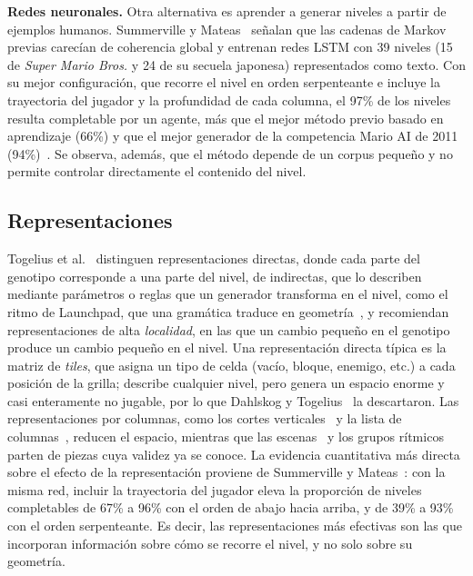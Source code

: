 \documentclass[letter, 10pt]{article}
\begin{document}
\textbf{Redes neuronales.} Otra alternativa es aprender a generar niveles a partir de ejemplos humanos. Summerville y Mateas~\cite{Summerville2016} se\~nalan que las cadenas de Markov previas carec\'ian de coherencia global y entrenan redes LSTM con 39 niveles (15 de \emph{Super Mario Bros.} y 24 de su secuela japonesa) representados como texto. Con su mejor configuraci\'on, que recorre el nivel en orden serpenteante e incluye la trayectoria del jugador y la profundidad de cada columna, el 97\% de los niveles resulta completable por un agente, m\'as que el mejor m\'etodo previo basado en aprendizaje (66\%) y que el mejor generador de la competencia Mario AI de 2011 (94\%)~\cite{Summerville2016}. Se observa, adem\'as, que el m\'etodo depende de un corpus peque\~no y no permite controlar directamente el contenido del nivel.

\subsection{Representaciones}

Togelius et al.~\cite{Togelius2011} distinguen representaciones directas, donde cada parte del genotipo corresponde a una parte del nivel, de indirectas, que lo describen mediante par\'ametros o reglas que un generador transforma en el nivel, como el ritmo de Launchpad, que una gram\'atica traduce en geometr\'ia~\cite{Smith2011}, y recomiendan representaciones de alta \emph{localidad}, en las que un cambio peque\~no en el genotipo produce un cambio peque\~no en el nivel. Una representaci\'on directa t\'ipica es la matriz de \emph{tiles}, que asigna un tipo de celda (vac\'io, bloque, enemigo, etc.) a cada posici\'on de la grilla; describe cualquier nivel, pero genera un espacio enorme y casi enteramente no jugable, por lo que Dahlskog y Togelius~\cite{Dahlskog2013} la descartaron. Las representaciones por columnas, como los cortes verticales~\cite{Dahlskog2013} y la lista de columnas~\cite{DePontes2022}, reducen el espacio, mientras que las escenas~\cite{Green2020} y los grupos r\'itmicos~\cite{Smith2011} parten de piezas cuya validez ya se conoce. La evidencia cuantitativa m\'as directa sobre el efecto de la representaci\'on proviene de Summerville y Mateas~\cite{Summerville2016}: con la misma red, incluir la trayectoria del jugador eleva la proporci\'on de niveles completables de 67\% a 96\% con el orden de abajo hacia arriba, y de 39\% a 93\% con el orden serpenteante. Es decir, las representaciones m\'as efectivas son las que incorporan informaci\'on sobre c\'omo se recorre el nivel, y no solo sobre su geometr\'ia.
\end{document}

